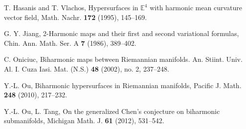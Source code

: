 \documentclass[twoside,reqno,A4]{amsart}
\theoremstyle{definition}
\theoremstyle{remark}
\numberwithin{equation}{section}
\begin{document}
\begin{thebibliography}{[1]}
T. Hasanis and T. Vlachos, Hypersurfaces in $\mathbb E^4$ with
harmonic mean curvature vector field, Math. Nachr. \textbf{172}
(1995), 145--169.

G. Y. Jiang, 2-Harmonic maps and their first and second variational
formulas, Chin. Ann. Math. Ser. A \textbf{7} (1986), 389--402.

C. Oniciuc, Biharmonic maps between Riemannian manifolds. An.
Stiint. Univ. Al. I. Cuza Iasi. Mat. (N.S.) \textbf{48} (2002), no.
2, 237--248.

Y.-L. Ou, Biharmonic hypersurfaces in Riemannian manifolds, Pacific
J. Math. \textbf{248} (2010), 217--232.

Y.-L. Ou, L. Tang, On the generalized Chen's conjecture on
biharmonic submanifolds, Michigan Math. J. \textbf{61} (2012),
531--542.
\end{thebibliography}
\end{document}
